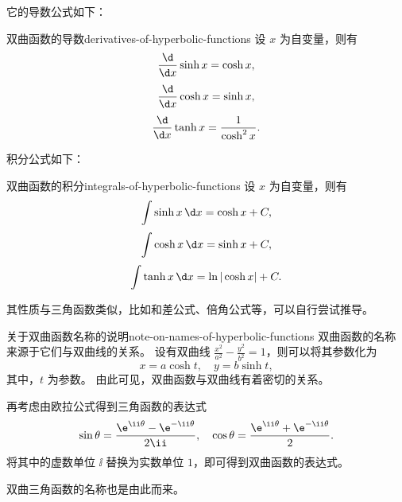 它的导数公式如下：
\begin{physlist}{双曲函数的导数}{derivatives-of-hyperbolic-functions}
    设 $ x $ 为自变量，则有
    \begin{equation}
        \frac{\d}{\d x} \sinh x = \cosh x ,
    \end{equation}
    \begin{equation}
        \frac{\d}{\d x} \cosh x = \sinh x ,
    \end{equation}
    \begin{equation}
        \frac{\d}{\d x} \tanh x = \frac{1}{\cosh^2 x} .
    \end{equation}

\end{physlist}

积分公式如下：
\begin{physlist}{双曲函数的积分}{integrals-of-hyperbolic-functions}
    设 $ x $ 为自变量，则有
    \begin{equation}
        \int \sinh x \, \d x = \cosh x + C ,
    \end{equation}
    \begin{equation}
        \int \cosh x \, \d x = \sinh x + C ,
    \end{equation}
    \begin{equation}
        \int \tanh x \, \d x = \ln |\cosh x| + C .
    \end{equation}

\end{physlist}

其性质与三角函数类似，比如和差公式、倍角公式等，可以自行尝试推导。

\begin{note}{关于双曲函数名称的说明}{note-on-names-of-hyperbolic-functions}
    双曲函数的名称来源于它们与双曲线的关系。
    设有双曲线 $ \frac{x^2}{a^2} - \frac{y^2}{b^2} = 1 $，则可以将其参数化为
    \begin{equation}
        x = a \cosh t , \quad y = b \sinh t ,
    \end{equation}
    其中，$ t $ 为参数。
    由此可见，双曲函数与双曲线有着密切的关系。

    再考虑由欧拉公式得到三角函数的表达式
    \begin{equation}
        \sin \theta = \frac{\e^{\ii \theta} - \e^{-\ii \theta}}{2 \ii} , \quad \cos \theta = \frac{\e^{\ii \theta} + \e^{-\ii \theta}}{2} .
    \end{equation}
    将其中的虚数单位 $ \ii $ 替换为实数单位 $ 1 $，即可得到双曲函数的表达式。

    双曲三角函数的名称也是由此而来。
\end{note}
